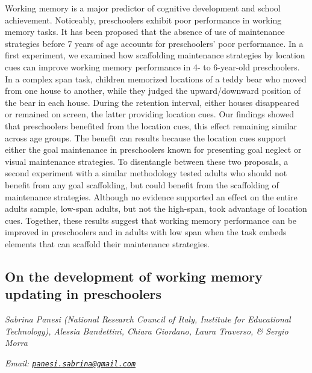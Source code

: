 \documentclass[
  12pt,
]{book}
\begin{document}
Working memory is a major predictor of cognitive development and school achievement. Noticeably, preschoolers exhibit poor performance in working memory tasks. It has been proposed that the absence of use of maintenance strategies before 7 years of age accounts for preschoolers' poor performance. In a first experiment, we examined how scaffolding maintenance strategies by location cues can improve working memory performance in 4- to 6-year-old preschoolers. In a complex span task, children memorized locations of a teddy bear who moved from one house to another, while they judged the upward/downward position of the bear in each house. During the retention interval, either houses disappeared or remained on screen, the latter providing location cues. Our findings showed that preschoolers benefited from the location cues, this effect remaining similar across age groups. The benefit can results because the location cues support either the goal maintenance in preschoolers known for presenting goal neglect or visual maintenance strategies. To disentangle between these two proposals, a second experiment with a similar methodology tested adults who should not benefit from any goal scaffolding, but could benefit from the scaffolding of maintenance strategies. Although no evidence supported an effect on the entire adults sample, low-span adults, but not the high-span, took advantage of location cues. Together, these results suggest that working memory performance can be improved in preschoolers and in adults with low span when the task embeds elements that can scaffold their maintenance strategies.

\hypertarget{on-the-development-of-working-memory-updating-in-preschoolers}{%
\subsection{On the development of working memory updating in preschoolers}\label{on-the-development-of-working-memory-updating-in-preschoolers}}

\emph{Sabrina Panesi (National Research Council of Italy, Institute for Educational Technology), Alessia Bandettini, Chiara Giordano, Laura Traverso, \& Sergio Morra}

\emph{Email: \href{mailto:panesi.sabrina@gmail.com}{\nolinkurl{panesi.sabrina@gmail.com}}}
\end{document}
